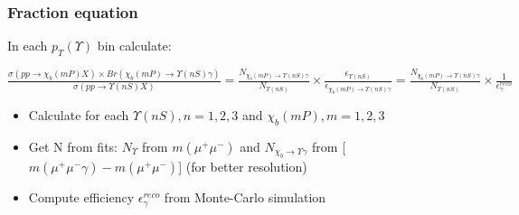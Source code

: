 \begin{frame}
\frametitle{Fraction equation}
In each $p_T(\Upsilon)$ bin calculate:
\begin{center}
$
\frac{\sigma(pp \to \chi_b (mP) X) \times Br (\chi_b (mP) \to \Upsilon(nS) \gamma)}{\sigma(pp \to \Upsilon(nS) X)} =
\frac{N_{\chi_b (mP)\to \Upsilon(nS) \gamma}}{N_{\Upsilon(nS)}} \times \frac{\epsilon_{\Upsilon(nS)}}{\epsilon_{\chi_b (mP)\to \Upsilon(nS) \gamma}} =
\frac{N_{\chi_b (mP)\to \Upsilon(nS) \gamma}}{N_{\Upsilon(nS)}} \times \frac{1}{\epsilon^{reco}_{\gamma}}
$
\end{center}
\begin{itemize}
  \item Calculate for each $\Upsilon(nS), n=1,2,3$ and $\chi_b(mP), m=1,2,3$
  \item Get N from fits: $N_{\Upsilon}$ from  $m(\mu^+ \mu^-)$ and $N_{\chi_b \rightarrow \Upsilon \gamma}$ from [$m(\mu^+ \mu^- \gamma) - m(\mu^+ \mu^-)$] (for better resolution)
  \item Compute efficiency $\epsilon^{reco}_{\gamma}$  from Monte-Carlo simulation
\end{itemize}
\end{frame}